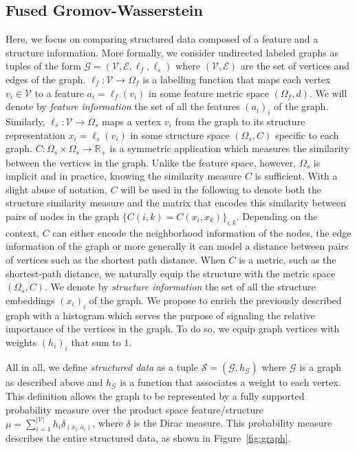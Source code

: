 \subsection{Fused Gromov-Wasserstein}

Here, we focus on comparing structured data composed of a feature
and a structure information.
More formally, we consider undirected labeled graphs as tuples of the form $\mathcal{G}=(\mathcal{V},\mathcal{E},\ell_f,\ell_s)$ where
$(\mathcal{V},\mathcal{E})$ are the set of vertices and edges of the graph.
$\ell_f: \mathcal{V} \rightarrow \Omega_f$ is a labelling function that
maps each vertex $v_{i} \in \mathcal{V}$ to a feature
$a_{i} = \ell_f(v_{i})$ in some feature metric space
$(\Omega_f,d)$.
We will denote by \emph{feature information} the set of all the features
$(a_{i})_{i}$ of the graph.
Similarly, $\ell_s: \mathcal{V} \rightarrow \Omega_s$ maps a vertex $v_i$ from
the graph to its structure representation
$x_{i} = \ell_s(v_{i})$ in some structure space
$(\Omega_s,C)$ specific to each graph.
$C : \Omega_s \times \Omega_s \rightarrow \mathbb{R_{+}}$ is a symmetric
application which measures the similarity between the vertices in the
graph.
Unlike the feature space, however, $\Omega_s$ is implicit and in practice,
knowing the similarity measure $C$ is sufficient. With a slight abuse of
notation, $C$ will be used in the following to denote both the structure
similarity measure and the matrix that encodes this similarity between pairs of
nodes in the graph $\{C(i,k) = C(x_i, x_k)\}_{i,k}$.
Depending on the context, $C$ can either encode the neighborhood information of
the nodes, the edge information of the graph or more generally it can model a
distance between pairs of vertices such as the shortest path distance.
When $C$ is a metric, such as the shortest-path
distance, we naturally equip the structure with the metric space $(\Omega_s,C)$.
We denote by \emph{structure information} the set of all the structure
embeddings $(x_{i})_i$ of the graph.
We propose to enrich the previously described graph with a histogram which
serves the purpose of signaling the relative importance of the vertices in the
graph.
To do so, we equip graph vertices with weights $(h_{i})_{i}$ that sum to $1$.

All in all, we define \emph{structured data} as a
tuple $\mathcal{S}=(\mathcal{G},h_{\mathcal{G}})$ where $\mathcal{G}$ is a
graph as described above and $h_{\mathcal{G}}$ is a function that
associates a weight to each vertex. This definition allows the graph to be
represented by a fully supported probability measure over the product space
feature/structure $\mu= \sum_{i=1}^{|\mathcal{V}|} h_{i} \delta_{(x_{i},a_{i})}$, where
$\delta$ is the Dirac measure.
This probability measure
describes the entire structured data, as shown in Figure~\ref{fig:graph}.

